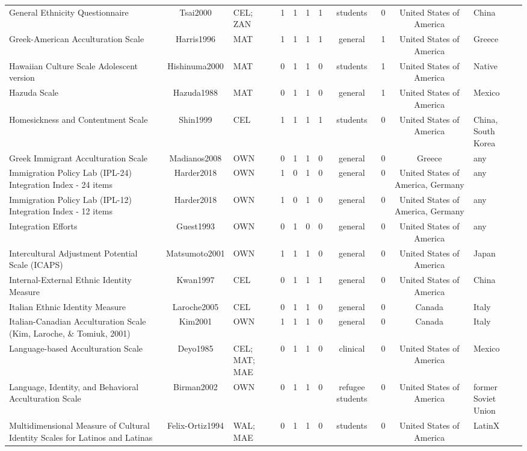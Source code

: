 \begin{longtable}[l]{lclclclclcl}
General Ethnicity Questionnaire & Tsai2000 & CEL; ZAN & 1 & 1 & 1 & 1 & students & 0 & United States of America & China\\
Greek-American Acculturation Scale & Harris1996 & MAT & 1 & 1 & 1 & 1 & general & 1 & United States of America & Greece\\
Hawaiian Culture Scale Adolescent version & Hishinuma2000 & MAT & 0 & 1 & 1 & 0 & students & 1 & United States of America & Native\\
Hazuda Scale & Hazuda1988 & MAT & 0 & 1 & 1 & 0 & general & 1 & United States of America & Mexico\\
Homesickness and Contentment Scale & Shin1999 & CEL & 1 & 1 & 1 & 1 & students & 0 & United States of America & China, South Korea\\
Greek Immigrant Acculturation Scale & Madianos2008 & OWN & 0 & 1 & 1 & 0 & general & 0 & Greece & any\\
Immigration Policy Lab (IPL-24) Integration Index - 24 items & Harder2018 & OWN & 1 & 0 & 1 & 0 & general & 0 & United States of America, Germany & any\\
Immigration Policy Lab (IPL-12) Integration Index - 12 items & Harder2018 & OWN & 1 & 0 & 1 & 0 & general & 0 & United States of America, Germany & any\\
Integration Efforts & Guest1993 & OWN & 0 & 1 & 0 & 0 & general & 0 & United States of America & any\\
Intercultural Adjustment Potential Scale (ICAPS) & Matsumoto2001 & OWN & 1 & 1 & 1 & 0 & general & 0 & United States of America & Japan\\
Internal-External Ethnic Identity Measure & Kwan1997 & CEL & 0 & 1 & 1 & 1 & general & 0 & United States of America & China\\
Italian Ethnic Identity Measure & Laroche2005 & CEL & 0 & 1 & 1 & 0 & general & 0 & Canada & Italy\\
Italian-Canadian Acculturation Scale (Kim, Laroche, \& Tomiuk, 2001) & Kim2001 & OWN & 1 & 1 & 1 & 0 & general & 0 & Canada & Italy\\
Language-based Acculturation Scale & Deyo1985 & CEL; MAT; MAE & 0 & 1 & 1 & 0 & clinical & 0 & United States of America & Mexico\\
Language, Identity, and Behavioral Acculturation Scale & Birman2002 & OWN & 0 & 1 & 1 & 0 & refugee students & 0 & United States of America & former Soviet Union\\
Multidimensional Measure of Cultural Identity Scales for Latinos and Latinas & Felix-Ortiz1994 & WAL; MAE & 0 & 1 & 1 & 0 & students & 0 & United States of America & LatinX\\

\end{longtable}
